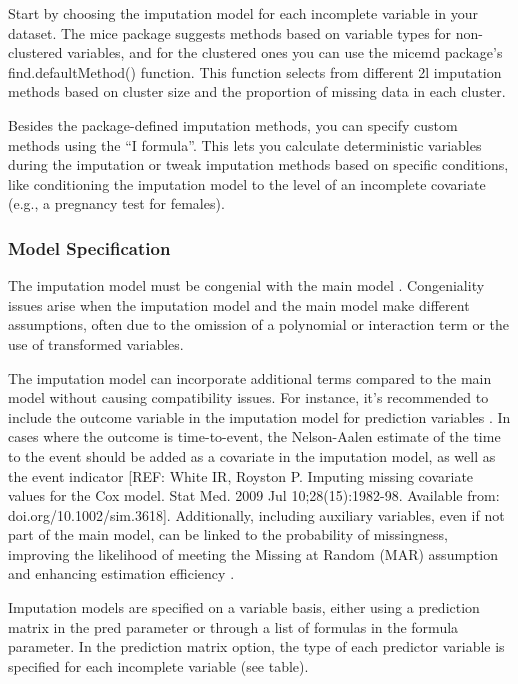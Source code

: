 \documentclass[
  article]{jss}
\begin{document}
Start by choosing the imputation model for each incomplete variable in
your dataset. The mice package suggests methods based on variable types
for non-clustered variables, and for the clustered ones you can use the
micemd package's find.defaultMethod() function. This function selects
from different 2l imputation methods based on cluster size and the
proportion of missing data in each cluster.

Besides the package-defined imputation methods, you can specify custom
methods using the ``I formula''. This lets you calculate deterministic
variables during the imputation or tweak imputation methods based on
specific conditions, like conditioning the imputation model to the level
of an incomplete covariate (e.g., a pregnancy test for females).

\hypertarget{model-specification}{%
\subsubsection{Model Specification}\label{model-specification}}

The imputation model must be congenial with the main model
\cite{meng1994}. Congeniality issues arise when the imputation model and
the main model make different assumptions, often due to the omission of
a polynomial or interaction term or the use of transformed variables.

The imputation model can incorporate additional terms compared to the
main model without causing compatibility issues. For instance, it's
recommended to include the outcome variable in the imputation model for
prediction variables \cite{moons2006a}. In cases where the outcome is
time-to-event, the Nelson-Aalen estimate of the time to the event should
be added as a covariate in the imputation model, as well as the event
indicator {[}REF: White IR, Royston P. Imputing missing covariate values
for the Cox model. Stat Med. 2009 Jul 10;28(15):1982-98. Available from:
doi.org/10.1002/sim.3618{]}. Additionally, including auxiliary
variables, even if not part of the main model, can be linked to the
probability of missingness, improving the likelihood of meeting the
Missing at Random (MAR) assumption and enhancing estimation efficiency
\cite{hardt2012a}.

Imputation models are specified on a variable basis, either using a
prediction matrix in the pred parameter or through a list of formulas in
the formula parameter. In the prediction matrix option, the type of each
predictor variable is specified for each incomplete variable (see
table).
\end{document}
